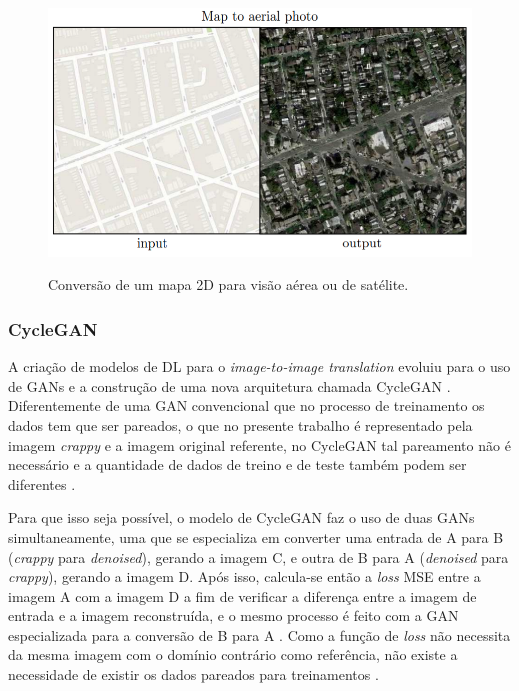 \begin{figure}[H]
  \centering
  \caption{Conversão de um mapa 2D para visão aérea ou de satélite.}
  \includegraphics[scale=.5]{figuras/image-to-image-map-to-aerial.png}
  \label{fig:image-to-image-map-to-aerial}
\end{figure}

\subsubsection{CycleGAN} \label{ssec:cycle-gan}

A criação de modelos de DL para o \textit{image-to-image translation} evoluiu para o uso de GANs e a construção de uma nova arquitetura chamada CycleGAN \cite{cycle-gan}. Diferentemente de uma GAN convencional que no processo de treinamento os dados tem que ser pareados, o que no presente trabalho é representado pela imagem \textit{crappy} e a imagem original referente, no CycleGAN tal pareamento não é necessário e a quantidade de dados de treino e de teste também podem ser diferentes \cite{cycle-gan}.

Para que isso seja possível, o modelo de CycleGAN faz o uso de duas GANs simultaneamente, uma que se especializa em converter uma entrada de A para B (\textit{crappy} para \textit{denoised}), gerando a imagem C, e outra de B para A (\textit{denoised} para \textit{crappy}), gerando a imagem D. Após isso, calcula-se então a \textit{loss} MSE entre a imagem A com a imagem D a fim de verificar a diferença entre a imagem de entrada e a imagem reconstruída, e o mesmo processo é feito com a GAN especializada para a conversão de B para A \cite{cycle-gan}. Como a função de \textit{loss} não necessita da mesma imagem com o domínio contrário como referência, não existe a necessidade de existir os dados pareados para treinamentos \cite{cycle-gan}.

